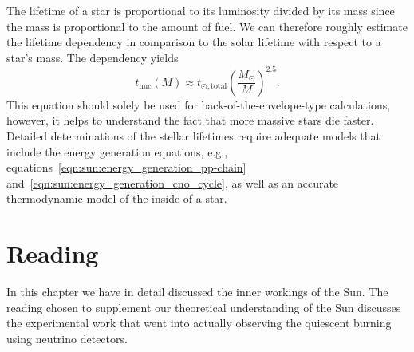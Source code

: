 The lifetime of a star is proportional to its luminosity divided by its mass since the mass is proportional to the amount of fuel. We can therefore roughly estimate the lifetime dependency in comparison to the solar lifetime with respect to a star's mass. The dependency yields
\begin{equation}
    t_\mathrm{nuc}(M) \approx t_{\odot\mathrm{,total}} \left(\frac{M_\odot}{M}\right)^{2.5}. \label{eqn:sun:stellar_lifetime_estimate}
\end{equation}
This equation should solely be used for back-of-the-envelope-type calculations, however, it helps to understand the fact that more massive stars die faster. Detailed determinations of the stellar lifetimes require adequate models that include the energy generation equations, e.g., equations~\eqref{eqn:sun:energy_generation_pp-chain} and~\eqref{eqn:sun:energy_generation_cno_cycle}, as well as an accurate thermodynamic model of the inside of a star.

\section{Reading}

In this chapter we have in detail discussed the inner workings of the Sun. The reading chosen to supplement our theoretical understanding of the Sun discusses the experimental work that went into actually observing the quiescent burning using neutrino detectors.

